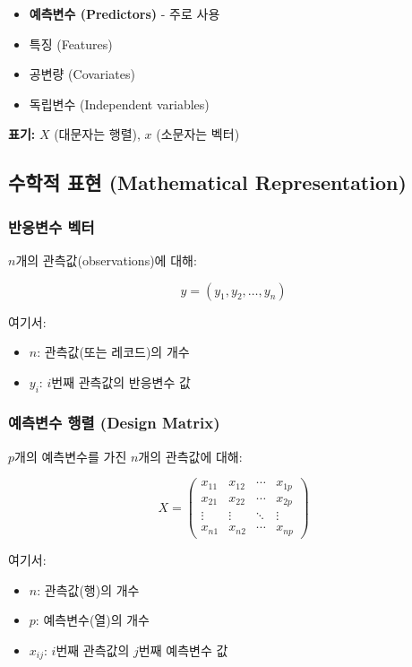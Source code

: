 \documentclass[12pt,a4paper]{article}
\begin{document}
\begin{itemize}
    \item \textbf{예측변수 (Predictors)} - 주로 사용
    \item 특징 (Features)
    \item 공변량 (Covariates)
    \item 독립변수 (Independent variables)
\end{itemize}

\textbf{표기:} $X$ (대문자는 행렬), $x$ (소문자는 벡터)

\subsection{수학적 표현 (Mathematical Representation)}

\subsubsection{반응변수 벡터}

$n$개의 관측값(observations)에 대해:

\begin{equation}
y = (y_1, y_2, \ldots, y_n)
\end{equation}

여기서:
\begin{itemize}
    \item $n$: 관측값(또는 레코드)의 개수
    \item $y_i$: $i$번째 관측값의 반응변수 값
\end{itemize}

\subsubsection{예측변수 행렬 (Design Matrix)}

$p$개의 예측변수를 가진 $n$개의 관측값에 대해:

\begin{equation}
X = \begin{pmatrix}
x_{11} & x_{12} & \cdots & x_{1p} \\
x_{21} & x_{22} & \cdots & x_{2p} \\
\vdots & \vdots & \ddots & \vdots \\
x_{n1} & x_{n2} & \cdots & x_{np}
\end{pmatrix}
\end{equation}

여기서:
\begin{itemize}
    \item $n$: 관측값(행)의 개수
    \item $p$: 예측변수(열)의 개수
    \item $x_{ij}$: $i$번째 관측값의 $j$번째 예측변수 값
\end{itemize}
\end{document}
